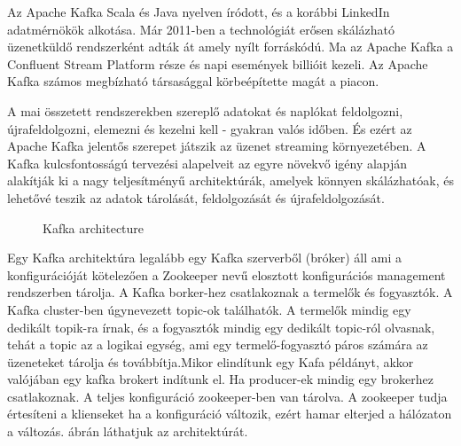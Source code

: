 
Az Apache Kafka Scala és Java nyelven íródott, és a korábbi LinkedIn adatmérnökök alkotása. Már 2011-ben a technológiát erősen skálázható üzenetküldő rendszerként adták át amely nyílt forráskódú. Ma az Apache Kafka a Confluent Stream Platform része és napi események billióit kezeli. Az Apache Kafka számos megbízható társasággal körbeépítette magát a piacon.

A mai összetett rendszerekben szereplő adatokat és naplókat feldolgozni, újrafeldolgozni, elemezni és kezelni kell - gyakran valós időben. És ezért az Apache Kafka jelentős szerepet játszik az üzenet streaming környezetében. A Kafka kulcsfontosságú tervezési alapelveit az egyre növekvő igény alapján alakítják ki a nagy teljesítményű architektúrák, amelyek könnyen skálázhatóak, és lehetővé teszik az adatok tárolását, feldolgozását és újrafeldolgozását.

 \begin{figure}[ht]
	\centering
	\caption{Kafka architecture} 
	\label{fig:kafka-architecture}
\end{figure}
Egy Kafka architektúra legalább egy Kafka szerverből (bróker) áll ami a konfigurációját kötelezően a Zookeeper nevű elosztott konfigurációs management rendszerben tárolja.  A Kafka borker-hez csatlakoznak a termelők és fogyasztók. A Kafka cluster-ben úgynevezett topic-ok találhatók. A termelők mindig egy dedikált topik-ra írnak, és a fogyasztók mindig egy dedikált topic-ról olvasnak, tehát a topic az a logikai egység, ami egy termelő-fogyasztó páros számára az üzeneteket tárolja és továbbítja.Mikor elindítunk egy Kafa példányt, akkor valójában egy kafka brokert indítunk el. Ha producer-ek mindig egy brokerhez csatlakoznak. A teljes konfiguráció zookeeper-ben van tárolva. A zookeeper tudja értesíteni a klienseket ha a konfiguráció változik, ezért hamar elterjed a hálózaton a változás.  ábrán láthatjuk az architektúrát.\newline


